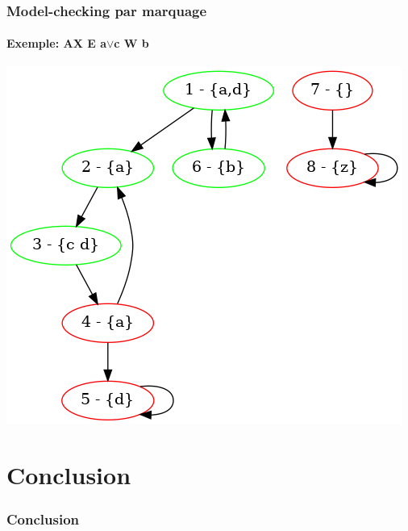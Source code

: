 \documentclass[11pt]{beamer}
\begin{document}
\begin{frame}
    \frametitle{Model-checking par marquage}
    \framesubtitle{Exemple: AX E a$\lor$c W b}

    \includegraphics[scale=0.4]{imgs/marquage4.png}
\end{frame}

\section*{Conclusion}
\begin{frame}
    \frametitle{Conclusion}
\end{frame}
\end{document}

